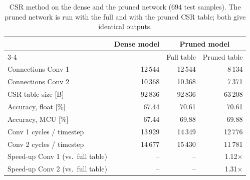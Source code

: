 \begin{table}[htbp]
\centering
\caption{CSR method on the dense and the pruned network (694 test samples). The pruned network
is run with the full and with the pruned CSR table; both give identical outputs.}
\label{tab:pruned_results}
\begin{tabular}{lrrr}
\toprule
 & Dense model & \multicolumn{2}{c}{Pruned model} \\
\cmidrule(lr){3-4}
 & & Full table & Pruned table \\
\midrule
Connections Conv 1 & 12\,544 & 12\,544 & 8\,134 \\
Connections Conv 2 & 10\,368 & 10\,368 & 7\,371 \\
CSR table size [B] & 92\,836 & 92\,836 & 63\,208 \\
Accuracy, float [\%] & 67.44 & 70.61 & 70.61 \\
Accuracy, MCU [\%] & 67.44 & 69.88 & 69.88 \\
Conv 1 cycles / timestep & 13\,929 & 14\,349 & 12\,776 \\
Conv 2 cycles / timestep & 14\,677 & 15\,430 & 11\,781 \\
\midrule
Speed-up Conv 1 (vs.\ full table) & -- & -- & 1.12$\times$ \\
Speed-up Conv 2 (vs.\ full table) & -- & -- & 1.31$\times$ \\
\bottomrule
\end{tabular}
\end{table}
